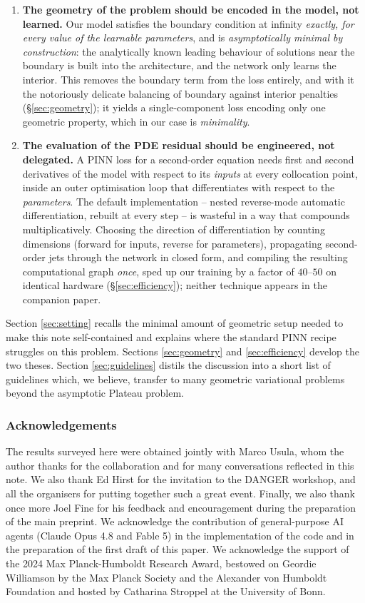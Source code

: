 \documentclass[oneside,british]{amsart}
\numberwithin{equation}{section}
\numberwithin{figure}{section}
\theoremstyle{plain}
\numberwithin{thm}{section}
\theoremstyle{plain}
\theoremstyle{plain}
\theoremstyle{definition}
\theoremstyle{remark}
\begin{document}
\begin{enumerate}
\item \textbf{The geometry of the problem should be encoded in the
model, not learned.} Our model satisfies the boundary condition at
infinity \emph{exactly, for every value of the learnable parameters},
and is \emph{asymptotically minimal by construction}: the analytically
known leading behaviour of solutions near the boundary is built into
the architecture, and the network only learns the interior. This
removes the boundary term from the loss entirely, and with it the
notoriously delicate balancing of boundary against interior penalties
(\S\ref{sec:geometry}); it yields a single-component loss encoding only
one geometric property, which in our case is \textit{minimality}.
\item \textbf{The evaluation of the PDE residual should be engineered,
not delegated.} A PINN loss for a second-order equation needs first and
second derivatives of the model with respect to its \emph{inputs} at
every collocation point, inside an outer optimisation loop that
differentiates with respect to the \emph{parameters}. The default
implementation -- nested reverse-mode automatic differentiation,
rebuilt at every step -- is wasteful in a way that compounds
multiplicatively. Choosing the direction of differentiation by counting
dimensions (forward for inputs, reverse for parameters), propagating
second-order jets through the network in closed form, and compiling the
resulting computational graph \emph{once}, sped up our training by a
factor of $40$--$50$ on identical hardware (\S\ref{sec:efficiency});
neither technique appears in the companion paper.
\end{enumerate}

Section \ref{sec:setting} recalls the minimal amount of geometric setup
needed to make this note self-contained and explains where the standard
PINN recipe struggles on this problem. Sections \ref{sec:geometry} and
\ref{sec:efficiency} develop the two theses. Section
\ref{sec:guidelines} distils the discussion into a short list of
guidelines which, we believe, transfer to many geometric variational
problems beyond the asymptotic Plateau problem.

\subsubsection*{Acknowledgements}
The results surveyed here were obtained jointly with Marco Usula, whom
the author thanks for the collaboration and for many conversations
reflected in this note. We also thank Ed Hirst for the invitation to the
DANGER workshop, and all the organisers for putting together such a great
event. Finally, we also thank once more Joel Fine for his
feedback and encouragement during the preparation of the main preprint.
We acknowledge the contribution of general-purpose AI agents (Claude Opus 4.8 and Fable 5)
in the implementation of the code and in the preparation of the first draft of this paper.
We acknowledge the support of the 2024
Max Planck-Humboldt Research Award, bestowed on Geordie Williamson by
the Max Planck Society and the Alexander von Humboldt Foundation and
hosted by Catharina Stroppel at the University of Bonn.
\end{document}
